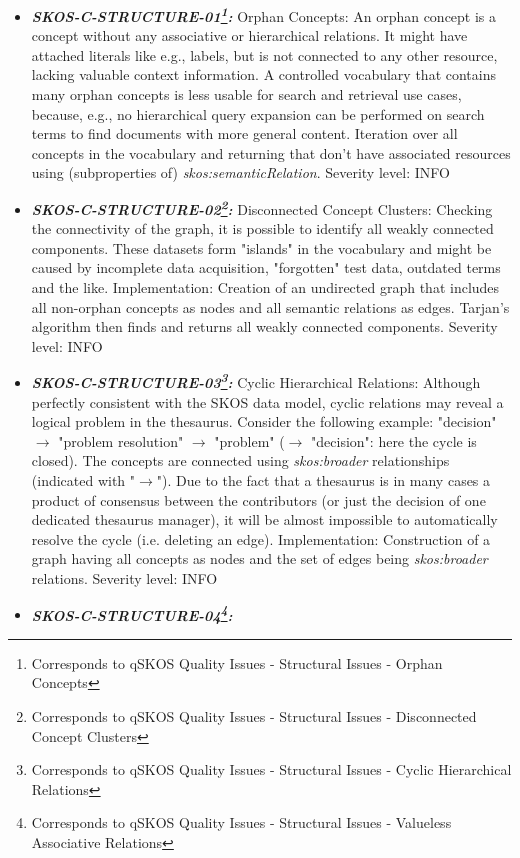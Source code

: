 \documentclass{llncs}
\begin{document}
\begin{itemize}
	\item \textbf{{\em SKOS-C-STRUCTURE-01\footnote{Corresponds to qSKOS Quality Issues - Structural Issues - Orphan Concepts}:}}
	Orphan Concepts:
  An orphan concept is a concept without any associative or hierarchical relations. It might have attached literals like e.g., labels, but is not connected to any other resource, lacking valuable context information. A controlled vocabulary that contains many orphan concepts is less usable for search and retrieval use cases, because, e.g., no hierarchical query expansion can be performed on search terms to find documents with more general content. 
	Iteration over all concepts in the vocabulary and returning that don't have associated resources using (subproperties of) \emph{skos:semanticRelation}. 
  Severity level: INFO
	\item \textbf{{\em SKOS-C-STRUCTURE-02\footnote{Corresponds to qSKOS Quality Issues - Structural Issues - Disconnected Concept Clusters}:}}
	Disconnected Concept Clusters:
	Checking the connectivity of the graph, it is possible to identify all weakly connected components. These datasets form "islands" in the vocabulary and might be caused by incomplete data acquisition, "forgotten" test data, outdated terms and the like. 
	Implementation: Creation of an undirected graph that includes all non-orphan concepts as nodes and all semantic relations as edges. Tarjan's algorithm then finds and returns all weakly connected components.
	Severity level: INFO
	\item \textbf{{\em SKOS-C-STRUCTURE-03\footnote{Corresponds to qSKOS Quality Issues - Structural Issues - Cyclic Hierarchical Relations}:}}
	Cyclic Hierarchical Relations: 
	Although perfectly consistent with the SKOS data model, cyclic relations may reveal a logical problem in the thesaurus. Consider the following example: "decision" $\rightarrow$ "problem resolution" $\rightarrow$ "problem" ($\rightarrow$ "decision": here the cycle is closed). The concepts are connected using \emph{skos:broader} relationships (indicated with "$\rightarrow$"). Due to the fact that a thesaurus is in many cases a product of consensus between the contributors (or just the decision of one dedicated thesaurus manager), it will be almost impossible to automatically resolve the cycle (i.e. deleting an edge). 
	Implementation: Construction of a graph having all concepts as nodes and the set of edges being \emph{skos:broader} relations. 
	Severity level: INFO
	\item \textbf{{\em SKOS-C-STRUCTURE-04\footnote{Corresponds to qSKOS Quality Issues - Structural Issues - Valueless Associative Relations}:}}

\end{itemize}
\end{document}
